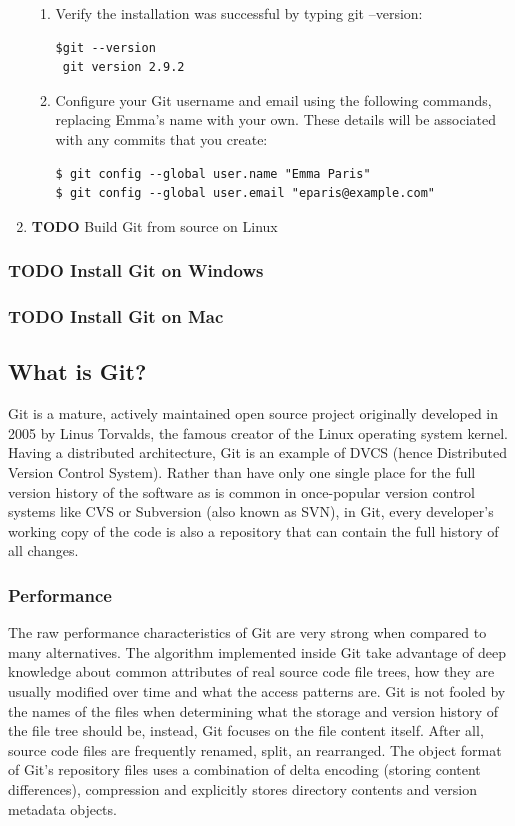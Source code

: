\documentclass[11pt]{article}
\begin{document}
\begin{enumerate}
\begin{enumerate}
\item Verify the installation was successful by typing git --version:
\begin{verbatim}
$git --version
 git version 2.9.2
\end{verbatim}

\item Configure your Git username and email using the following commands, replacing Emma's name with your own. These details will be associated with any commits that you create:
\begin{verbatim}
$ git config --global user.name "Emma Paris"
$ git config --global user.email "eparis@example.com"
\end{verbatim}
\end{enumerate}
\item {\bfseries\sffamily TODO} Build Git from source on Linux
\label{sec:org7da5635}
\end{enumerate}
\subsubsection{{\bfseries\sffamily TODO} Install Git on Windows}
\label{sec:org1d1675b}
\subsubsection{{\bfseries\sffamily TODO} Install Git on Mac}
\label{sec:orgee1b3b2}
\subsection{What is Git?}
\label{sec:org01f735d}
Git is a mature, actively maintained open source project originally developed in 2005 by Linus Torvalds, the famous creator of the Linux operating system kernel. Having a distributed architecture, Git is an example of DVCS (hence Distributed Version Control System). Rather than have only one single place for the full version history of the software as is common in once-popular version control systems like CVS or Subversion (also known as SVN), in Git, every developer's working copy of the code is also a repository that can contain the full history of all changes.

\subsubsection{Performance}
\label{sec:org43cd869}
The raw performance characteristics of Git are very strong when compared to many alternatives. The algorithm implemented inside Git take advantage of deep knowledge about common attributes of real source code file trees, how they are usually modified over time and what the access patterns are. Git is not fooled by the names of the files when determining what the storage and version history of the file tree should be, instead, Git focuses on the file content itself. After all, source code files are frequently renamed, split, an rearranged. The object format of Git's repository files uses a combination of delta encoding (storing content differences), compression and explicitly stores directory contents and version metadata objects.
\end{document}
